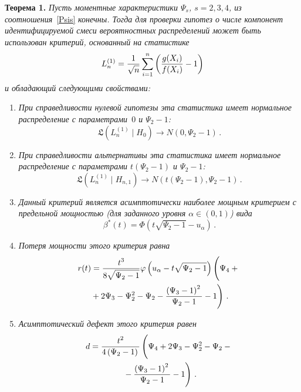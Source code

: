 \begin{multicols}{2}
\noindent
\textbf{Теорема 1.}
\textit{Пусть моментные характеристики $\Psi_s$, $s=2,3,4$, из
соотношения}~\eqref{Psis} \textit{конечны. Тогда для проверки гипотез о числе
компонент идентифицируемой смеси вероятностных распределений может
быть использован критерий, основанный на статистике
\begin{equation*}
L_n^{(1)}=\displaystyle\frac{\displaystyle 1\mathstrut}{\displaystyle \sqrt{n}\mathstrut}\sum\limits_{i=1}^{n}\left(\displaystyle\frac{\displaystyle g(X_i)\mathstrut}{\displaystyle f(X_i)\mathstrut}-1\right)
\end{equation*}
и обладающий следующими свойствами:}
\begin{enumerate}
\item \textit{При справедливости нулевой гипотезы эта статистика имеет
нормальное распределение с па\-ра\-мет\-ра\-ми~$0$ и $\Psi_2-1$:}
\begin{equation*}
\mathfrak{L}(L_n^{(1)}\mid H_0)\rightarrow N(0,\Psi_2-1)\,.
\end{equation*}
\item \textit{При справедливости альтернативы эта статистика имеет
нормальное распределение с па\-ра\-мет\-ра\-ми $t\left(\Psi_2-1\right)$ и
$\Psi_2-1$:}
\begin{equation*}
\mathfrak{L}(L_n^{(1)}\mid H_{n,1})\rightarrow
N(t\left(\Psi_2-1\right),\Psi_2-1)\,.
\end{equation*}
\item \textit{Данный критерий является асимптотически наиболее мощным критерием с предельной мощностью
\emph{(}для заданного уровня $\alpha\in(0,1)$\emph{)} вида}
\begin{equation*}
\beta^*(t)=\Phi(t\sqrt{\Psi_2-1}-u_\alpha)\,.
\end{equation*}
\item \textit{Потеря мощности этого критерия равна}
\begin{multline*}
r(t)=\fr{t^3}{8\sqrt{\Psi_2-1}}\varphi\left(u_\alpha-t\sqrt{\Psi_2-1}\right)
\left(\vphantom{\fr{\left(\Psi_3-1\right)^2}{\Psi_2-1}-1}\Psi_4+{}\right.\\
\left.{}+2\Psi_3-\Psi^2_2-\Psi_2-\fr{\left(\Psi_3-1\right)^2}{\Psi_2-1}-1\right)\,.
\end{multline*}
\item \textit{Асимптотический дефект этого критерия равен}
\begin{multline*}
d=\fr{t^2}{4\left(\Psi_2-1\right)}
\left(\vphantom{\fr{\left(\Psi_3-1\right)^2}{\Psi_2-1}}
\Psi_4+2\Psi_3-\Psi^2_2-\Psi_2-{}\right.\\
\left.{}-\fr{\left(\Psi_3-1\right)^2}{\Psi_2-1}-1\right)\,.
\end{multline*}
\end{enumerate}



\end{multicols}
